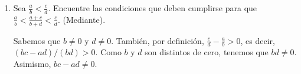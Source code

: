 \documentclass[11pt]{article}
\begin{document}
\begin{enumerate}[label=\alph*)]
\begin{itemize}
    \end{itemize}

    \item Sea $\frac{a}{b}<\frac{c}{d}$. Encuentre las condiciones que deben cumplirse para que $\frac{a}{b}<\frac{a+c}{b+d}<\frac{c}{d}$. (Mediante).

    Sabemos que $b\neq 0$ y $d\neq 0$. También, por definición, $\frac{c}{d}-\frac{a}{b}>0$, es decir, $(bc-ad)/(bd)>0$. Como $b$ y $d$ son distintos de cero, tenemos que $bd\neq 0$. Asimismo, $bc-ad\neq 0$.


\end{enumerate}
\end{document}
